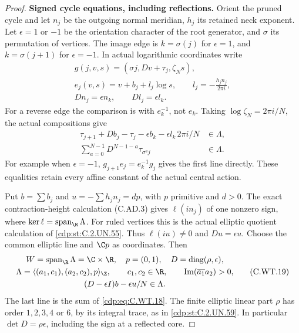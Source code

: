 \begin{proof}
\par\medskip\noindent\textbf{Signed cycle equations, including reflections.}
Orient the pruned cycle and let \(n_j\)
be the outgoing normal meridian,
\(h_j\) its retained neck exponent.
Let \(\epsilon=1\) or \(-1\) be the
orientation character of the root
generator, and \(\sigma\) its
permutation of vertices. The image
edge is \(k=\sigma(j)\) for
\(\epsilon=1\), and
\(k=\sigma(j+1)\) for \(\epsilon=-1\).
In actual logarithmic coordinates
write
\[
 \begin{gathered}
 g(j,v,s)=(\sigma j,Dv+\tau_j,\zeta_Ns),\\
 e_j(v,s)=v+b_j+l_j\log s,\qquad
       l_j=-\frac{h_jn_j}{2\pi i},\\
 Dn_j=\epsilon n_k,\qquad
 Dl_j=\epsilon l_k.
 \end{gathered}
 \tag{C.WT.17}\label{cdp:eq:C.WT.17}
\]
For a reverse edge the comparison
is with \(e_k^{-1}\), not \(e_k\).
Taking \(\log\zeta_N=2\pi i/N\),
the actual compositions give
\[
 \begin{aligned}
 \tau_{j+1}+Db_j-\tau_j
       -\epsilon b_k-\epsilon l_k\,2\pi i/N
                                      &\in\Lambda,\\
 \sum_{a=0}^{N-1}D^{N-1-a}
                       \tau_{\sigma^a j}&\in\Lambda.
 \end{aligned}
 \tag{C.WT.18}\label{cdp:eq:C.WT.18}
\]
For example when \(\epsilon=-1\),
\(g_{j+1}e_j=e_k^{-1}g_j\) gives
the first line directly. These
equalities retain every affine
constant of the actual central
action.

Put \(b=\sum b_j\) and
\(u=-\sum h_jn_j=dp\), with \(p\)
primitive and \(d>0\). The exact
contraction-height calculation
(C.AD.3) gives
\(\ell(in_j)\) of one nonzero
sign, where
\(\ker\ell=\operatorname{span}_{\R}\Lambda\).
For ruled vertices this is the
actual elliptic quotient
calculation of \ref{cdp:st:C.2.UN.55}.
Thus \(\ell(iu)\ne0\) and
\(Du=\epsilon u\).
Choose the common elliptic
line and \(\C p\) as coordinates.
Then
\[
 \begin{gathered}
 W=\operatorname{span}_{\R}\Lambda=\C\times\R,\quad
 p=(0,1),\quad D=\operatorname{diag}(\rho,\epsilon),\\
 \Lambda=\langle(a_1,c_1),(a_2,c_2),p\rangle_{\Z},
 \qquad c_1,c_2\in\R,\qquad
        \operatorname{Im}(\overline{a_1}a_2)>0,\\
              (D-\epsilon I)b-\epsilon u/N\in\Lambda.
 \end{gathered}
 \tag{C.WT.19}\label{cdp:eq:C.WT.19}
\]
The last line is the sum of
\eqref{cdp:eq:C.WT.18}. The finite elliptic
linear part \(\rho\) has order
\(1,2,3,4\) or \(6\), by its
integral trace, as in \ref{cdp:st:C.2.UN.59}.
In particular
\(\det D=\rho\epsilon\), including
the sign at a reflected core.


\end{proof}
